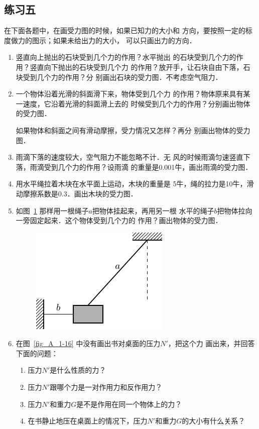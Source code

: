 \subsection*{练习五} 
    在下面各题中，在画受力图的时候，如果已知力的大小和
方向，要按照一定的标度做力的图示；如果未给出力的大小，
可以只画出力的方向．
\begin{enumerate} 
\item 竖直向上抛出的石块受到几个力的作用？水平抛出
的石块受到几个力的作用？竖直向下抛出的石块受到几个力
的作用？放开手，让石块自由下落，石块受到几个力的作用？分
别画出石块的受力图．不考虑空气阻力．

\item 一个物体沿着光滑的斜面滑下来，物体受到几个力
的作用？物体原来具有某一速度，它沿着光滑的斜面滑上去的
时候受到几个力的作用？分别画出物体的受力图．

    如果物体和斜面之间有滑动摩擦，受力情况又怎样？再分
别画出物体的受力图．

\item 雨滴下落的速度较大，空气阻力不能忽略不计．无
风的时候雨滴匀速竖直下落，雨滴受到几个力的作用？设雨滴
的重量是0.001牛，画出雨滴的受力图．

\item 用水平绳拉着木块在水平面上运动，木块的重量是
5牛，绳的拉力是10牛，滑动摩擦系数是0.3．画出木块的受力图．

\item 如图~\ref{fig_A_1-21} 那样用一根绳子$a$把物体挂起来，再用另一根
水平的绳子$b$把物体拉向一旁固定起来．这个物体受到几个力的
作用？画出物体的受力图．

\begin{figure}[htbp]
    \centering
    \includegraphics{fig/A/1-21.pdf} 
    \caption{} \label{fig_A_1-21} 
\end{figure} 

\item  在图~\ref{fig_A_1-16} 中没有画出书对桌面的压力$N'$，把这个力
画出来，并回答下面的问题：
\begin{enumerate} 
\item 压力$N'$是什么性质的力？
\item 压力$N'$跟哪个力是一对作用力和反作用力？
\item 压力$N'$和重力$G$是不是作用在同一个物体上的力？
\item 在书静止地压在桌面上的情况下，压力$N'$和重力$G$的大小有什么关系？
\end{enumerate} 


\end{enumerate} 

